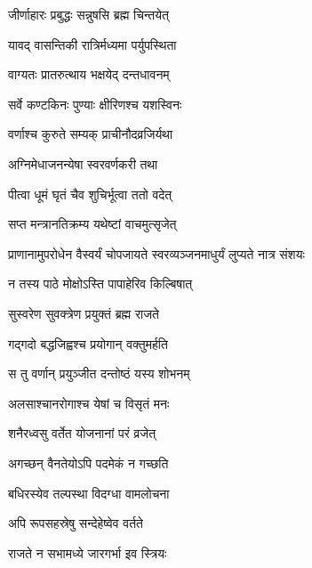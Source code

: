 {जीर्णाहारः प्रबुद्धः सन्नुषसि ब्रह्म चिन्तयेत्}

{यावद् वासन्तिकी रात्रिर्मध्यमा पर्युपस्थिता}

{वाग्यतः प्रातरुत्थाय भक्षयेद् दन्तधावनम्}

{सर्वे कण्टकिनः पुण्याः क्षीरिणश्च यशस्विनः}

{वर्णाश्च कुरुते सम्यक् प्राचीनौदव्रजिर्यथा}

{अग्निमेधाजनन्येषा स्वरवर्णकरी तथा}

{पीत्वा धूमं घृतं चैव शुचिर्भूत्वा ततो वदेत्}

{सप्त मन्त्रानतिक्रम्य यथेष्टां वाचमुत्सृजेत्}

{प्राणानामुपरोधेन वैस्वर्यं चोपजायते}
{स्वरव्यञ्जनमाधुर्यं लुप्यते नात्र संशयः}

{न तस्य पाठे मोक्षोऽस्ति पापाहेरिव किल्बिषात्}

{सुस्वरेण सुवक्त्रेण प्रयुक्तं ब्रह्म राजते}

{गद्गदो बद्धजिह्वश्च प्रयोगान् वक्तुमर्हति}

{स तु वर्णान् प्रयुञ्जीत दन्तोष्ठं यस्य शोभनम्}

{अलसाश्चानरोगाश्च येषां च विसृतं मनः}

{शनैरध्वसु वर्तेत योजनानां परं व्रजेत्}

{अगच्छन् वैनतेयोऽपि पदमेकं न गच्छति}

{बधिरस्येव तल्पस्था विदग्धा वामलोचना}

{अपि रूपसहस्रेषु सन्देहेष्वेव वर्तते}

{राजते न सभामध्ये जारगर्भा इव स्त्रियः}

